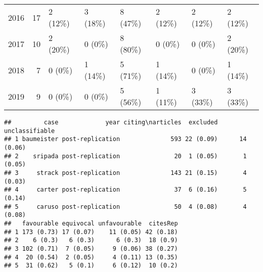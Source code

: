 \begin{appendix}
\begin{longtable}[t]{lrllllll}
\hspace{1em}2016 & 17 & 2 (12\%) & 3 (18\%) & 8 (47\%) & 2 (12\%) & 2 (12\%) & 2 (12\%)\\
\hspace{1em}2017 & 10 & 2 (20\%) & 0 (0\%) & 8 (80\%) & 0 (0\%) & 0 (0\%) & 2 (20\%)\\
\hspace{1em}2018 & 7 & 0 (0\%) & 1 (14\%) & 5 (71\%) & 1 (14\%) & 0 (0\%) & 1 (14\%)\\
\hspace{1em}2019 & 9 & 0 (0\%) & 0 (0\%) & 5 (56\%) & 1 (11\%) & 3 (33\%) & 3 (33\%)\\
\bottomrule
\end{longtable}

\begin{verbatim}
##         case             year citing\narticles  excluded unclassifiable
## 1 baumeister post-replication              593 22 (0.09)      14 (0.06)
## 2    sripada post-replication               20  1 (0.05)       1 (0.05)
## 3     strack post-replication              143 21 (0.15)       4 (0.03)
## 4     carter post-replication               37  6 (0.16)       5 (0.14)
## 5     caruso post-replication               50  4 (0.08)       4 (0.08)
##   favourable equivocal unfavourable  citesRep
## 1 173 (0.73) 17 (0.07)    11 (0.05) 42 (0.18)
## 2    6 (0.3)   6 (0.3)      6 (0.3)  18 (0.9)
## 3 102 (0.71)  7 (0.05)     9 (0.06) 38 (0.27)
## 4  20 (0.54)  2 (0.05)     4 (0.11) 13 (0.35)
## 5  31 (0.62)   5 (0.1)     6 (0.12)  10 (0.2)
\end{verbatim}
\end{appendix}
